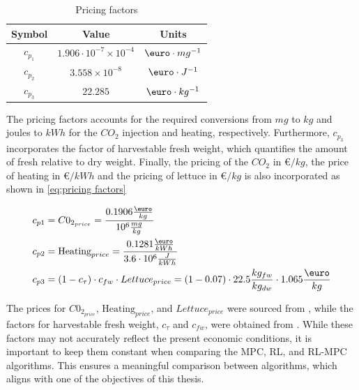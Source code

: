 \begin{table}[H]
	\centering
	\begin{tabular}{|c|c|c|}
		\hline
		\textbf{Symbol} & \textbf{Value} & \textbf{Units} \\
		\hline
		$c_{p_1}$ & $1.906\cdot 10^{-7} \times 10^{-4}$ & $ \text{\euro} \cdot mg^{-1}$ \\
		$c_{p_2}$ & $3.558 \times 10^{-8}$ & $ \text{\euro} \cdot J^{-1}$ \\
		$c_{p_3}$ & $22.285$ & $\text{\euro} \cdot kg^{-1}$ \\ 
		\hline
	\end{tabular}
	\caption{Pricing factors}
	\label{tab:pricing_factors}
\end{table}


The pricing factors accounts for the required conversions from $mg$ to $kg$ and joules to $kWh$ for the $CO_2$ injection and heating, respectively. Furthermore, $c_{p_3}$ incorporates the factor of harvestable fresh weight, which quantifies the amount of fresh relative to dry weight. Finally, the pricing of the $CO_2$ in \euro $/kg$, the price of heating in \euro$/kWh$ and the pricing of lettuce in \euro$/kg$ is also incorporated as shown in \autoref{eq:pricing factors}

\begin{equation}\label{eq:pricing factors}
	\begin{aligned}
		& c_{p1} = C0_{2_{price}}  =  \frac{0.1906 \frac{\text{\euro}}{kg}}{10^{6} \frac{mg}{kg}}\\
		& c_{p2} = \text{Heating}_{price} = \frac{0.1281 \frac{\text{\euro}}{kWh}}{3.6\cdot 10^{6} \frac{J}{kWh}}\\
		& c_{p3} = (1-c_{\tau})  \cdot c_{fw} \cdot Lettuce_{price}= (1-0.07) \cdot 22.5 \frac{kg_{fw}}{kg_{dw}} \cdot 1.065 \frac{\text{\euro}}{kg} \\
	\end{aligned}
\end{equation}

The prices for $C0_{2_{price}}$, $\text{Heating}_{price}$, and $Lettuce_{price}$ were sourced from \cite{vandenbemdRobustDeepReinforcement}, while the factors for harvestable fresh weight, $c_{\tau}$ and $c_{fw}$, were obtained from \cite{hentenGreenhouseClimateManagement1994}. While these factors may not accurately reflect the present economic conditions, it is important to keep them constant when comparing the MPC, RL, and RL-MPC algorithms. This ensures a meaningful comparison between algorithms, which aligns with one of the objectives of this thesis. 


